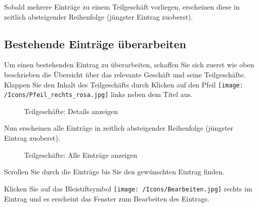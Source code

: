 Sobald mehrere Einträge zu einem Teilgeschäft vorliegen, erscheinen diese in zeitlich absteigender Reihenfolge (jüngster Eintrag zuoberst).

\subsection{Bestehende Einträge überarbeiten}

Um einen bestehenden Eintrag zu überarbeiten, schaffen Sie sich zuerst wie oben beschrieben die Übersicht über das relevante Geschäft und seine Teilgeschäfte. Klappen Sie den Inhalt des Teilgeschäfts durch Klicken auf den Pfeil \texttt{[image: /Icons/Pfeil\_rechts\_rosa.jpg]} links neben dem Titel aus.
	
\begin{figure}[H]
\caption{Teilgeschäfte: Details anzeigen}
\end{figure}

Nun erscheinen alle Einträge in zeitlich absteigender Reihenfolge (jüngster Eintrag zuoberst).

\begin{figure}[H]
\caption{Teilgeschäfte: Alle Einträge anzeigen}
\end{figure}

Scrollen Sie durch die Einträge bis Sie den gewünschten Eintrag finden.

\vspace{\baselineskip}

Klicken Sie auf das Bleistiftsymbol \texttt{[image: /Icons/Bearbeiten.jpg]}  rechts im Eintrag und es erscheint das Fenster zum Bearbeiten des Eintrags.

